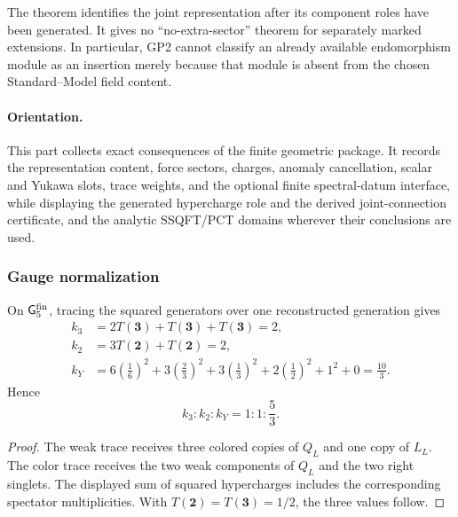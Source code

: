 \documentclass[12pt,a4paper]{article}
\begin{document}
\begin{remark}
\label{p5:rem:finite-algebra-uniqueness-scope}
The theorem identifies the joint representation after its component roles
have been generated.  It gives no ``no-extra-sector'' theorem for separately
marked extensions.  In particular,
GP2 cannot classify an already available endomorphism module as an insertion
merely because that module is absent from the chosen Standard--Model field
content.
\end{remark}

\label{p5:part:gauge-anomaly-spectral-closure}

\paragraph{Orientation.}
This part collects exact consequences of the finite geometric package.
It records the representation content, force sectors, charges, anomaly
cancellation, scalar and Yukawa slots, trace weights, and the optional finite
spectral-datum interface, while displaying the generated hypercharge role and the
derived joint-connection certificate, and the analytic SSQFT/PCT domains wherever
their conclusions are used.

\subsubsection{Gauge normalization}
\label{p5:sec:part1-gauge-normalization}

\begin{proposition}
\label{p5:prop:representation-trace-weights}
On \(\mathsf G_5^{\rm fin}\), tracing the squared
generators over one reconstructed generation gives
\begin{align}
k_3&=2T(\mathbf 3)+T(\mathbf 3)+T(\mathbf 3)=2,\\
k_2&=3T(\mathbf 2)+T(\mathbf 2)=2,\\
k_Y&=
6\left(\frac16\right)^2
+
3\left(\frac23\right)^2
+
3\left(\frac13\right)^2
+
2\left(\frac12\right)^2
+
1^2
+
0
=
\frac{10}{3}.
\end{align}
Hence
\begin{equation}
\label{p5:eq:part1-gauge-ratio}
k_3:k_2:k_Y=1:1:\frac53.
\end{equation}
\end{proposition}

\begin{proof}
The weak trace receives three colored copies of \(Q_L\) and one copy of
\(L_L\).  The color trace receives the two weak components of \(Q_L\) and
the two right singlets.  The displayed sum of squared hypercharges includes
the corresponding spectator multiplicities.  With
\(T(\mathbf2)=T(\mathbf3)=1/2\), the three values follow.
\end{proof}
\end{document}
